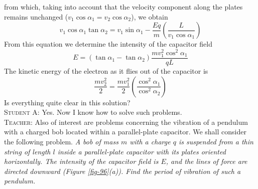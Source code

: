 \documentclass[a4paper,sfsidenotes]{tufte-book}
\begin{document}
from which, taking into account that the velocity component along the plates remains unchanged ($v_{1} \cos \alpha_{1} = v_{2} \cos \alpha_{2}$), we obtain
\begin{equation*}%
v_{1} \cos \alpha_{1} \tan \alpha_{2} = v_{1} \sin \alpha_{1} - \frac{Eq}{m} \left( \frac{L}{v_{1} \cos \alpha_{1}} \right)
\end{equation*}
From this equation we determine the intensity of the capacitor field
\begin{equation}%
E = ( \tan \alpha_{1} - \tan \alpha_{2}) \frac{mv_{1}^{2} \cos^{2} \alpha_{1}}{qL}
\label{eq-147}
\end{equation}
The kinetic energy of the electron as it flies out of the capacitor is
\begin{equation}%
\frac{mv_{2}^{2}}{2} = \frac{mv_{1}^{2}}{2} \left( \frac{\cos^{2} \alpha_{1}}{\cos^{2} \alpha_{2}} \right)
\label{eq-148}
\end{equation}
Is everything quite clear in this solution?
\\
\textsc{Student A:} Yes. Now I know how to solve such problems.
\\
\textsc{Teacher:} Also of interest are problems concerning the vibration of a pendulum with a charged bob located within a parallel-plate capacitor. We shall consider the following problem. \emph{A bob of mass $m$ with a charge $q$ is suspended from a thin string of length $l$ inside a parallel-plate capacitor with its plates oriented horizontally. The intensity of the capacitor field is $E$, and the lines of force are directed downward (\emph{Figure \ref{fig-96}(a)}). Find the period of vibration of such a pendulum.}
\\
\end{document}
